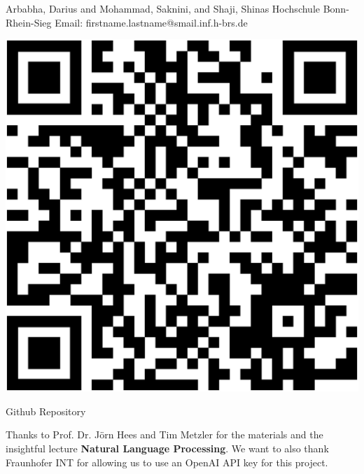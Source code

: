 {
	\vspace*{1cm}
	\begin{minipage}{0.75\linewidth}
		\vspace*{-2.5cm}
		Arbabha, Darius and Mohammad, Saknini, and Shaji, Shinas\newline
		Hochschule Bonn-Rhein-Sieg\newline
		Email: firstname.lastname@smail.inf.h-brs.de\newline
	\end{minipage}
	\begin{minipage}{0.24\linewidth}
		\centering
		\vspace{-1.5cm}
		\begin{tikzfigure}
			\includegraphics[scale=0.125]{figures/qrcode.eps}
		\end{tikzfigure}
		Github Repository
	\end{minipage}
	\vspace*{-3cm}
	
}
{
	
	Thanks to Prof. Dr. Jörn Hees and Tim Metzler for the materials and the insightful lecture \textbf{Natural Language Processing}.\newline
	We want to also thank Fraunhofer INT for allowing us to use an OpenAI API key for this project.
}